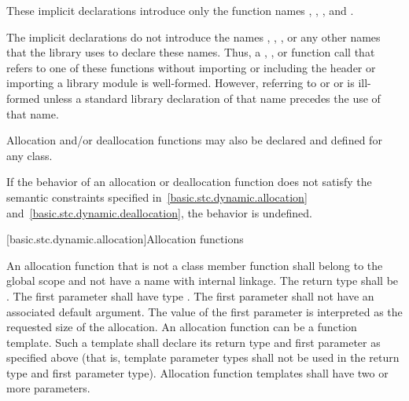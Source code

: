 These implicit declarations introduce only the function names
,
,
, and
.
\begin{note}
The implicit declarations do not introduce
the names ,
,
,
or any other names that the library uses to
declare these names. Thus, a ,
, or function call that refers to one of
these functions without importing or including the header 
or importing a \Cpp{} library module
is well-formed. However, referring to 
or 
or 
is ill-formed unless
a standard library declaration
of that name precedes the use of that name.
\end{note}
Allocation and/or
deallocation functions may also be declared and defined for any
class.

\pnum
If the behavior of an allocation or deallocation function
does not satisfy the semantic constraints
specified in~\ref{basic.stc.dynamic.allocation}
and~\ref{basic.stc.dynamic.deallocation},
the behavior is undefined.


[basic.stc.dynamic.allocation]{Allocation functions}

\pnum
{}%
An allocation function that is not a class member function
shall belong to the global scope and not have a name with internal linkage.
The return type shall be . The first
parameter shall have type . The
first parameter shall not have an associated default
argument. The value of the first parameter
is interpreted as the requested size of the allocation. An allocation
function can be a function template. Such a template shall declare its
return type and first parameter as specified above (that is, template
parameter types shall not be used in the return type and first parameter
type). Allocation function templates shall have two or more parameters.

